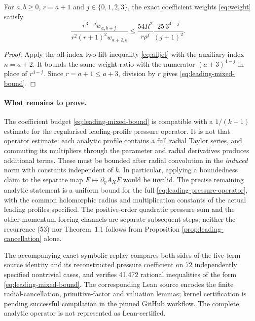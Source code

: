 \begin{lemma}
\label{lem:leading-weight-budget}
For $a,b\ge0$, $r=a+1$ and $j\in\{0,1,2,3\}$, the exact
coefficient weights \eqref{eq:weight} satisfy
\begin{equation}\label{eq:leading-mixed-bound}
 \frac{r^{3-j}w_{a,b+j}}{r^2(r+1)^2 w_{a+2,b}}
 \le \frac{54R^2}{r\rho^j}
       \frac{25\,3^{4-j}}{(j+1)^2}.
\end{equation}
\end{lemma}
\begin{proof}
Apply the all-index two-lift inequality
\eqref{eq:alljet} with the auxiliary index $n=a+2$.
It bounds the same weight ratio with the numerator
$(a+3)^{4-j}$ in place of $r^{4-j}$.
Since $r=a+1\le a+3$, division by $r$ gives
\eqref{eq:leading-mixed-bound}.
\end{proof}

\paragraph{What remains to prove.}
The coefficient budget \eqref{eq:leading-mixed-bound} is compatible
with a $1/(k+1)$ estimate for the regularised leading-profile
pressure operator. It is not that operator estimate: each analytic
profile contains a full radial Taylor series, and commuting its
multipliers through the parameter and radial derivatives produces
additional terms. These must be bounded after radial convolution in
the \emph{induced} norm with constants independent of $k$.
In particular, applying a boundedness claim to the separate map
$F\mapsto\partial_\eta A_XF$ would be invalid. The precise remaining
analytic statement is a uniform bound for the full
\eqref{eq:leading-pressure-operator}, with the common holomorphic
radius and multiplication constants of the actual leading profiles
specified. The positive-order quadratic pressure sum and the other
momentum forcing channels are separate subsequent steps; neither the
recurrence (53) nor Theorem~1.1 follows from Proposition
\ref{prop:leading-cancellation} alone.

The accompanying exact symbolic replay compares both sides of the
five-term source identity and its reconstructed pressure coefficient
on 72 independently specified nontrivial cases, and verifies 41,472
rational inequalities of the form \eqref{eq:leading-mixed-bound}.
The corresponding Lean source encodes the finite radial-cancellation,
primitive-factor and valuation lemmas; kernel certification is pending
successful compilation in the pinned GitHub workflow. The complete analytic
operator is not represented as Lean-certified.
